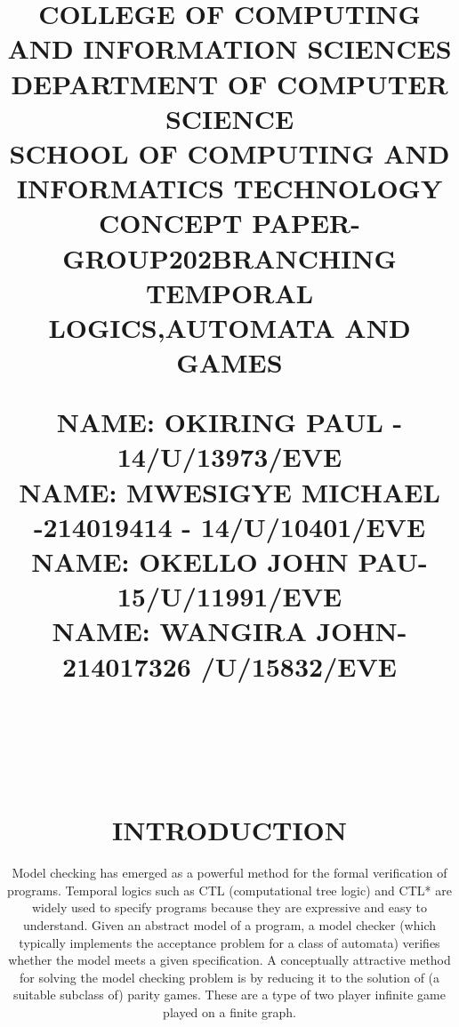 \documentclass[12pt,letterpaper]{article}
\begin{document}
\title{COLLEGE OF COMPUTING AND INFORMATION SCIENCES\\ DEPARTMENT OF COMPUTER SCIENCE\\ SCHOOL OF COMPUTING AND INFORMATICS TECHNOLOGY\\}
\maketitle

\title{NAME:	         OKIRING PAUL   - 14/U/13973/EVE   \\  NAME:     MWESIGYE MICHAEL -214019414 - 14/U/10401/EVE   \\  NAME:  OKELLO JOHN PAU\space - 15/U/11991/EVE\\ NAME:   WANGIRA JOHN\space- 214017326 /U/15832/EVE
\maketitle
\\
\\
\begin{center}
\title {\textbf{CONCEPT PAPER-GROUP202}}
\end{center}
\title{\textbf{BRANCHING TEMPORAL LOGICS,AUTOMATA AND GAMES}}
\maketitle

\section{INTRODUCTION}

     Model checking has emerged as a powerful method for the formal verification of programs. Temporal logics such as CTL (computational tree logic) and CTL* are widely used to specify programs because they are expressive and easy to understand. Given an abstract model of a program, a model checker (which typically implements the acceptance problem for a class of automata) verifies whether the model meets a given specification. A conceptually attractive method for solving the model checking problem is by reducing it to the solution of (a suitable subclass of) parity games. These are a type of two player infinite game played on a finite graph.
}
\end{document}
